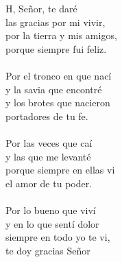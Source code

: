 \begin{cancion}%
	H, Señor, te daré \\
las gracias por mi vivir,\\
por la tierra y mis amigos, \\
porque siempre fui feliz.\\
	\jump\\
Por el tronco en que nací \\
y la savia que encontré\\
y los brotes que nacieron \\
portadores de tu fe.\\
	\jump\\
Por las veces que caí \\
y las que me levanté\\
porque siempre en ellas vi \\
el amor de tu poder.\\
	\jump\\
Por lo bueno que viví \\
y en lo que sentí dolor\\
siempre en todo yo te vi, \\
te doy gracias Señor\\
\end{cancion}%
